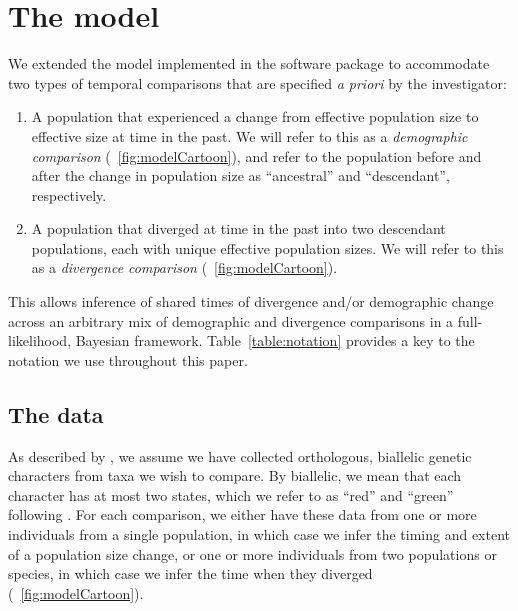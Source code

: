 \section{The model}

We extended the model implemented in the software package \ecoevolity to
accommodate two types of temporal comparisons
that are specified \emph{a priori} by the investigator:
\begin{enumerate}
    \item A population that experienced a change from effective population size
        \epopsize[\rootpopindex]
        to effective size
        \epopsize[\descendantpopindex{}]
        at time \comparisonetime in the past.
        We will refer to this as a \emph{demographic comparison}
        (\fig{}~\ref{fig:modelCartoon}),
        and refer to the population before and after the change in population
        size as ``ancestral'' and ``descendant'', respectively.
    \item A population that diverged at time \comparisonetime in the past into
        two descendant populations, each with unique effective population
        sizes.
        We will refer to this as a \emph{divergence comparison}
        (\fig{}~\ref{fig:modelCartoon}).
\end{enumerate}
This allows inference of shared times of divergence and/or demographic change
across an arbitrary mix of demographic and divergence comparisons in a
full-likelihood, Bayesian framework.
Table~\ref{table:notation} provides a key to the notation we use throughout
this paper.

\ifembed{

}{}

\subsection{The data}
As described by \citet{Oaks2018ecoevolity},
we assume we have collected orthologous, biallelic genetic characters from taxa
we wish to compare.
By biallelic, we mean that each character has at most two states,
which we refer to as ``red'' and ``green'' following \citet{Bryant2012}.
For each comparison, we either have these data from one or more individuals
from a single population, in which case we infer the timing and extent of a
population size change, or one or more individuals from two populations or
species,
in which case we infer the time when they diverged (\fig{}~\ref{fig:modelCartoon}).

